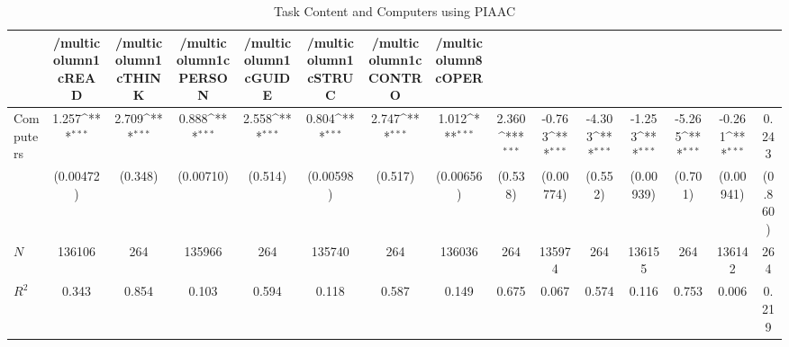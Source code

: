 \begin{table}[htbp]\centering
\def\sym#1{\ifmmode^{#1}\else\(^{#1}\)\fi}
\caption{Task Content and Computers using PIAAC}
\begin{tabular}{l*{14}{c}}
\hline\hline
            &/multicolumn{1}{c}{READ}&/multicolumn{1}{c}{THINK}&/multicolumn{1}{c}{PERSON}&/multicolumn{1}{c}{GUIDE}&/multicolumn{1}{c}{STRUC}&/multicolumn{1}{c}{CONTRO}&/multicolumn{8}{c}{OPER}                                                                                                                                                       \\
\hline
Computers   &       1.257\sym{***}&       2.709\sym{***}&       0.888\sym{***}&       2.558\sym{***}&       0.804\sym{***}&       2.747\sym{***}&       1.012\sym{***}&       2.360\sym{***}&      -0.763\sym{***}&      -4.303\sym{***}&      -1.253\sym{***}&      -5.265\sym{***}&      -0.261\sym{***}&       0.243         \\
            &   (0.00472)         &     (0.348)         &   (0.00710)         &     (0.514)         &   (0.00598)         &     (0.517)         &   (0.00656)         &     (0.538)         &   (0.00774)         &     (0.552)         &   (0.00939)         &     (0.701)         &   (0.00941)         &     (0.860)         \\
\hline
\(N\)       &      136106         &         264         &      135966         &         264         &      135740         &         264         &      136036         &         264         &      135974         &         264         &      136155         &         264         &      136142         &         264         \\
\(R^{2}\)   &       0.343         &       0.854         &       0.103         &       0.594         &       0.118         &       0.587         &       0.149         &       0.675         &       0.067         &       0.574         &       0.116         &       0.753         &       0.006         &       0.219         \\
\hline\hline
\end{tabular}
\end{table}
